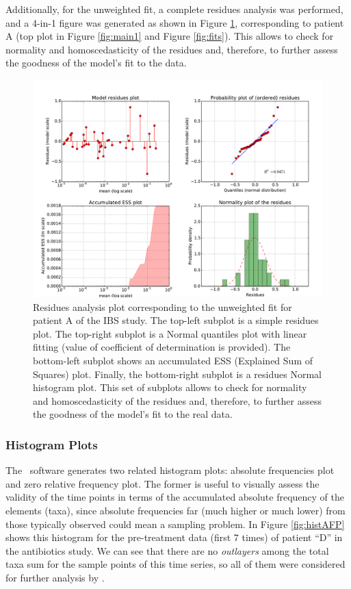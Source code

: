 Additionally, for the unweighted fit, a complete residues analysis was performed, and a 4-in-1 figure was generated as shown in Figure \ref{fig:unwRes}, corresponding to patient A (top plot in Figure \ref{fig:main1} and Figure \ref{fig:fits}). This allows to check for normality and homoscedasticity of the residues and, therefore, to further assess the goodness of the model's fit to the data.

\begin{figure}
	\centering
	\includegraphics[width=\textwidth]{results/fits/IBS_h_A_amplicons_family_stdVSmean_LLR_RES.pdf}
	\caption{Residues analysis plot corresponding to the unweighted fit for patient A of the IBS study\cite{IBS}. The top-left subplot is a simple residues plot. The top-right subplot is a Normal quantiles plot with linear fitting (value of coefficient of determination is provided). The bottom-left subplot shows an accumulated ESS (Explained Sum of Squares) plot. Finally, the bottom-right subplot is a residues Normal histogram plot. This set of subplots allows to check for normality and homoscedasticity of the residues and, therefore, to further assess the goodness of the model's fit to the real data.}
	\label{fig:unwRes}
\end{figure}

\subsubsection*{Histogram Plots} 
The \CC\ software generates two related histogram plots: absolute frequencies plot and zero relative frequency plot. The former is useful to visually assess the validity of the time points in terms of the accumulated absolute frequency of the elements (taxa), since absolute frequencies far (much higher or much lower) from those typically observed could mean a sampling problem. In Figure \ref{fig:histAFP} shows this histogram for the pre-treatment data (first 7 times) of patient ``D'' in the antibiotics study\cite{antibiotic}. We can see that there are no \emph{outlayers} among the total taxa sum for the sample points of this time series, so all of them were considered for further analysis by \CC.

